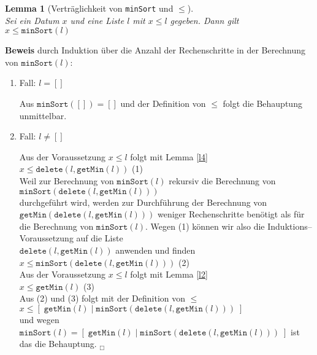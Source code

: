 \documentclass{article}
\newtheorem{Lemma}[Definition]{Lemma}
\begin{document}
\begin{Lemma}[Vertr\"aglichkeit von \texttt{minSort} und $\leq$] \hspace*{\fill} \\
\label{l6}
Sei ein Datum $x$ und eine Liste $l$ mit $x \leq l$ gegeben. Dann gilt \\[0.1cm]
\hspace*{1.3cm} $x \leq \mathtt{minSort}(l)$
\end{Lemma}
\textbf{Beweis} durch Induktion \"uber die Anzahl der Rechenschritte in der Berechnung
von $\texttt{minSort}(l)$:
\begin{enumerate}
\item Fall: $l = []$

      Aus $\mathtt{minSort}([]) = []$ und der Definition von $\leq$ folgt die Behauptung
      unmittelbar.
\item Fall: $l \not= []$

     Aus der Voraussetzung $x \leq l$ folgt mit Lemma \ref{l4} \\[0.1cm]
     \hspace*{1.3cm} $x \leq  \mathtt{delete}(l, \mathtt{getMin}(l))$ \hspace*{\fill} (1) \\[0.1cm]
     Weil zur Berechnung von $\mathtt{minSort}(l)$ rekursiv die Berechnung von \\[0.1cm]
     \hspace*{1.3cm} $\mathtt{minSort}(\mathtt{delete}(l, \mathtt{getMin}(l)))$ \\[0.1cm]
     durchgef\"uhrt wird,
     werden zur Durchf\"uhrung der Berechnung von  $\mathtt{getMin}(\mathtt{delete}(l, \mathtt{getMin}(l)))$
     weniger Rechenschritte ben\"otigt als f\"ur die Berechnung von $\mathtt{minSort}(l)$.
     Wegen (1) k\"onnen wir also die Induktions--Voraussetzung auf die Liste \\
     $\mathtt{delete}(l, \mathtt{getMin}(l))$ anwenden und finden \\[0.1cm]
     \hspace*{1.3cm}  $x \leq  \mathtt{minSort}(\mathtt{delete}(l, \mathtt{getMin}(l)))$ \hspace*{\fill} (2) \\[0.1cm]
     Aus der Voraussetzung $x \leq l$ folgt mit Lemma \ref{l2} \\[0.1cm]
     \hspace*{1.3cm} $x \leq \mathtt{getMin}(l)$  \hspace*{\fill} (3) \\[0.1cm]
     Aus (2) und (3) folgt mit der Definition von $\leq$ \\[0.1cm]
     \hspace*{1.3cm}      $x \leq [\;\mathtt{getMin}(l)\;|\;\mathtt{minSort}(\mathtt{delete}(l,\mathtt{getMin}(l)))\;]$   \\[0.1cm]
     und wegen $\mathtt{minSort}(l) =  [\;\mathtt{getMin}(l)\;|\;\mathtt{minSort}(\mathtt{delete}(l,\mathtt{getMin}(l)))\;]$ 
     ist das die Behauptung. \hspace*{\fill} $_\Box$
\end{enumerate}
\end{document}
